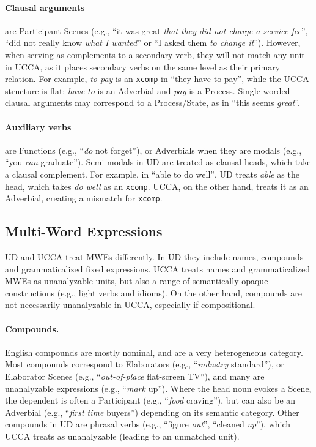 \documentclass[11pt,a4paper]{article}
\begin{document}
\paragraph{Clausal arguments}
    are Participant Scenes
    (e.g., ``it was great \textit{that they did not charge a service fee}'',
    ``did not really know \textit{what I wanted}'' or
    ``I asked them \textit{to change it}'').
    However, when serving as complements to a secondary verb, they
    will not match any unit in UCCA, as it places secondary verbs on the 
    same level as their primary relation. 
    For example, \textit{to pay} is an \texttt{xcomp} in ``they have to pay'', while
    the UCCA structure is flat: \textit{have to} is an Adverbial and \textit{pay} is a Process.
    Single-worded clausal arguments may correspond to a Process/State,
    as in ``this seems \textit{great}''.

\paragraph{Auxiliary verbs}
    are Functions (e.g., ``\textit{do} not forget''),
    or Adverbials when they are modals (e.g., ``you \textit{can} graduate''). Semi-modals 
    in UD are treated as clausal heads, which take a clausal complement. 
    For example, in ``able to do well'', UD treats \textit{able} as the head,
    which takes \textit{do well} as an \texttt{xcomp}. UCCA, on the other hand,
    treats it as an Adverbial, creating a mismatch for \texttt{xcomp}.
    

\subsection{Multi-Word Expressions}\label{sec:mwe}

UD and UCCA treat MWEs differently.
In UD they include names, compounds and grammaticalized fixed expressions.
UCCA treats names and grammaticalized MWEs as unanalyzable units,
but also a range of semantically opaque constructions
(e.g., light verbs and idioms).
On the other hand, compounds are not necessarily unanalyzable in UCCA,
especially if compositional.

\paragraph{Compounds.} English compounds are mostly nominal,
        and are a very heterogeneous category.
        Most compounds correspond to Elaborators (e.g., ``\textit{industry} standard''),
        or Elaborator Scenes (e.g., ``\textit{out-of-place} flat-screen TV''),
        and many are unanalyzable expressions (e.g., ``\textit{mark} up'').
        Where the head noun evokes a Scene, the dependent is often a Participant
        (e.g., ``\textit{food} craving''), but can also be an Adverbial 
        (e.g., ``\textit{first time} buyers'') depending on its semantic category.
        Other compounds in UD are phrasal verbs (e.g., ``figure \textit{out}'', ``cleaned \textit{up}''),
        which UCCA treats as unanalyzable (leading to an unmatched unit). 
            
\end{document}
